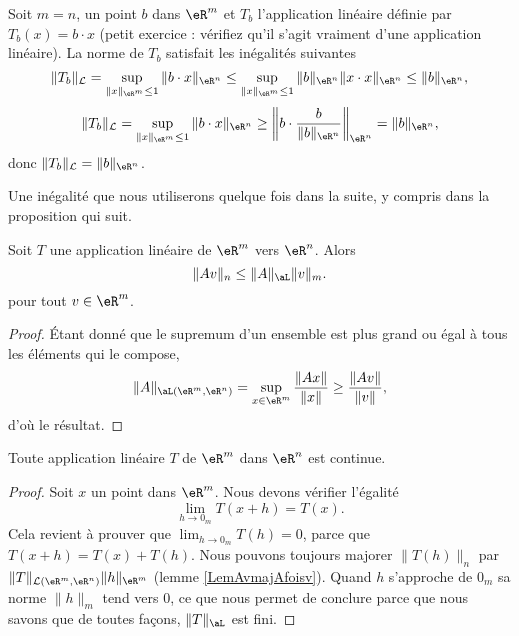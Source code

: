 \begin{example}
  Soit $m=n$, un point $b$ dans $\eR^m$ et $T_b$ l'application linéaire définie par $T_b(x)=b\cdot x$ (petit exercice : vérifiez qu'il s'agit vraiment d'une application linéaire).  La norme de $T_b$ satisfait les inégalités suivantes 
 \[
\|T_b\|_{\mathcal{L}}=\sup_{\|x\|_{\eR^m}\leq 1}\|b\cdot x\|_{\eR^n}\leq \sup_{\|x\|_{\eR^m}\leq 1}\|b \|_{\eR^n}\|x\cdot x\|_{\eR^n}\leq\|b \|_{\eR^n},
\]
\[
\|T_b\|_{\mathcal{L}}=\sup_{\|x\|_{\eR^m}\leq 1}\|b\cdot x\|_{\eR^n}\geq \left\|b\cdot \frac{b}{\|b \|_{\eR^n}}\right\|_{\eR^n}=\|b \|_{\eR^n},
\]
donc $\|T_b\|_{\mathcal{L}}=\|b \|_{\eR^n}$.
\end{example}

Une inégalité que nous utiliserons quelque fois dans la suite, y compris dans la proposition qui suit.
\begin{lemma}		\label{LemAvmajAfoisv}
	Soit $T$ une application linéaire de $\eR^m$ vers $\eR^n$. Alors
	\begin{equation}
		\| Av \|_n\leq \| A \|_{\aL}\| v \|_m.
	\end{equation}
	pour tout $v\in\eR^m$.
\end{lemma}

\begin{proof}
	Étant donné que le supremum d'un ensemble est plus grand ou égal à tous les éléments qui le compose,
	\begin{equation}
		\| A \|_{\aL(\eR^m,\eR^n)}=\sup_{x\in\eR^m}\frac{ \| Ax \| }{ \| x \| }\geq\frac{ \| Av \| }{ \| v \| },
	\end{equation}
	d'où le résultat.
\end{proof}

\begin{proposition}
  Toute application linéaire $T$ de $\eR^m$ dans $\eR^n$ est continue. 
\end{proposition}
\begin{proof}
  Soit $x$ un point dans $\eR^m$. Nous devons vérifier l'égalité
\[
\lim_{h\to 0_m}T(x+h)=T(x).
\]
Cela revient à prouver que $\lim_{h\to 0_m}T(h)=0$, parce que $T(x+h)=T(x)+T(h)$. Nous pouvons toujours majorer $\|T(h)\|_n$ par $\|T\|_{\mathcal{L}(\eR^m,\eR^n)}\| h \|_{\eR^m}$ (lemme \ref{LemAvmajAfoisv}). Quand $h$ s'approche de $ 0_m $ sa norme $\|h\|_m$ tend vers $0$, ce que nous permet de conclure parce que nous savons que de toutes façons, $\| T \|_{\aL}$ est fini.
\end{proof}

